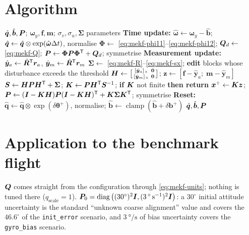 \section{Algorithm}
\begin{algorithm}[H]
\caption{MEKF --- one sampling period}
\begin{algorithmic}[1]
\Require $\hat{\bm{q}},\hat{\bm{b}},\bm{P}$; $\bm{\omega}_y,\bm{f},\bm{m}$; $\sigma_v,\sigma_u,\bm{\Sigma}$ parameters
\State \textbf{Time update:} $\hat{\bm{\omega}}\gets\bm{\omega}_y-\hat{\bm{b}}$;\;
       $\hat{\bm{q}}\gets\hat{\bm{q}}\otimes\exp(\hat{\bm{\omega}}\Delta t)$, normalise
\State $\bm{\Phi}\gets$ \eqref{eq:mekf-phi11}--\eqref{eq:mekf-phi12};\;
       $\bm{Q}_d\gets$ \eqref{eq:mekf-Q};\;
       $\bm{P}\gets\bm{\Phi}\bm{P}\bm{\Phi}^{\mathsf{T}}+\bm{Q}_d$; symmetrise
\State \textbf{Measurement update:} $\hat{\bm{y}}_a\gets\hat{\bm{R}}^{\mathsf{T}}\bm{r}_a$,\;
       $\hat{\bm{y}}_m\gets\hat{\bm{R}}^{\mathsf{T}}\bm{r}_m$
\State $\bm{\Sigma}\gets$ \eqref{eq:mekf-R}--\eqref{eq:mekf-sx}; \textbf{edit} blocks whose
       disturbance exceeds the threshold
\State $\bm{H}\gets\big[\begin{smallmatrix}[\hat{\bm{y}}_a]_\times&\bm{0}\\ [\hat{\bm{y}}_m]_\times&\bm{0}\end{smallmatrix}\big]$;\;
       $\bm{z}\gets[\bm{f}-\hat{\bm{y}}_a;\;\bm{m}-\hat{\bm{y}}_m]$
\State $\bm{S}\gets\bm{H}\bm{P}\bm{H}^{\mathsf{T}}+\bm{\Sigma}$;\; $\bm{K}\gets\bm{P}\bm{H}^{\mathsf{T}}\bm{S}^{-1}$;\;
       \textbf{if} $\bm{K}$ not finite \textbf{then return}
\State $\bm{x}^+\gets\bm{K}\bm{z}$;\;
       $\bm{P}\gets(\bm{I}-\bm{K}\bm{H})\bm{P}(\bm{I}-\bm{K}\bm{H})^{\mathsf{T}}+\bm{K}\bm{\Sigma}\bm{K}^{\mathsf{T}}$; symmetrise
\State \textbf{Reset:} $\hat{\bm{q}}\gets\hat{\bm{q}}\otimes\exp(\delta\bm{\theta}^+)$, normalise;\;
       $\hat{\bm{b}}\gets\operatorname{clamp}(\hat{\bm{b}}+\delta\bm{b}^+)$
\Ensure $\hat{\bm{q}},\hat{\bm{b}},\bm{P}$
\end{algorithmic}
\end{algorithm}

\section{Application to the benchmark flight}
$\bm{Q}$ comes straight from the configuration through \eqref{eq:mekf-units}; nothing is tuned there
($q_{\text{scale}}=1$). $\bm{P}_0=\operatorname{diag}\big((30^\circ)^2\bm{I},(\SI{3}{\degree\per\second})^2\bm{I}\big)$:
a $30^\circ$ initial attitude uncertainty is the standard ``unknown coarse alignment'' value and
covers the $46.6^\circ$ of the \texttt{init\_error} scenario, and
$\SI{3}{\degree\per\second}$ of bias uncertainty covers the \texttt{gyro\_bias} scenario.


